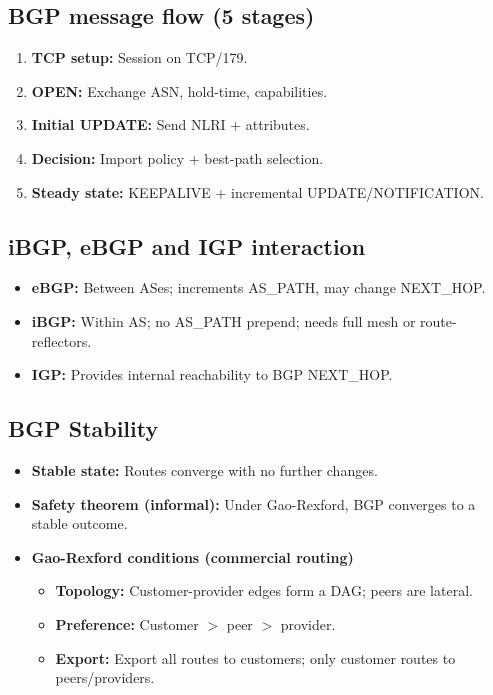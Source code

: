\subsection{BGP message flow (5 stages)}
\begin{enumerate}
    \item \textbf{TCP setup:} Session on TCP/179.
    \item \textbf{OPEN:} Exchange ASN, hold-time, capabilities.
    \item \textbf{Initial UPDATE:} Send NLRI + attributes.
    \item \textbf{Decision:} Import policy + best-path selection.
    \item \textbf{Steady state:} KEEPALIVE + incremental UPDATE/NOTIFICATION.
\end{enumerate}

\subsection{iBGP, eBGP and IGP interaction}
\begin{itemize}
    \item \textbf{eBGP:} Between ASes; increments AS\_PATH, may change NEXT\_HOP.
    \item \textbf{iBGP:} Within AS; no AS\_PATH prepend; needs full mesh or route-reflectors.
    \item \textbf{IGP:} Provides internal reachability to BGP NEXT\_HOP.
\end{itemize}

\subsection{BGP Stability}
\begin{itemize}
    \item \textbf{Stable state:} Routes converge with no further changes.
    \item \textbf{Safety theorem (informal):} Under Gao-Rexford, BGP converges to a stable outcome.
    \item \textbf{Gao-Rexford conditions (commercial routing)}
    \begin{itemize}
        \item \textbf{Topology:} Customer-provider edges form a DAG; peers are lateral.
        \item \textbf{Preference:} Customer $>$ peer $>$ provider.
        \item \textbf{Export:} Export all routes to customers; only customer routes to peers/providers.
    \end{itemize}
\end{itemize}